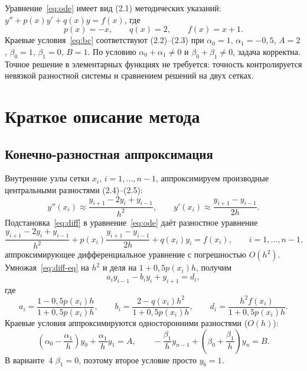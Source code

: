 \documentclass[14pt,a4paper]{extarticle}
\begin{document}
Уравнение~\eqref{eq:ode} имеет вид (2.1) методических указаний:
$y''+p(x)y'+q(x)y=f(x)$, где
\begin{equation}
    p(x) = -x, \qquad q(x) = 2, \qquad f(x) = x+1 .
    \label{eq:coeff}
\end{equation}
Краевые условия~\eqref{eq:bc} соответствуют (2.2)--(2.3) при
$\alpha_0=1$, $\alpha_1=-0{,}5$, $A=2$, $\beta_0=1$, $\beta_1=0$, $B=1$.
По условию $\alpha_0+\alpha_1\ne0$ и $\beta_0+\beta_1\ne0$, задача
корректна. Точное решение в элементарных функциях не требуется: точность
контролируется невязкой разностной системы и сравнением решений на двух
сетках.

\section{Краткое описание метода}

\subsection{Конечно-разностная аппроксимация}

Внутренние узлы сетки $x_i$, $i=1,\ldots,n-1$, аппроксимируем производные
центральными разностями (2.4)--(2.5):
\begin{equation}
    y''(x_i) \approx \frac{y_{i+1}-2y_i+y_{i-1}}{h^2}, \qquad
    y'(x_i) \approx \frac{y_{i+1}-y_{i-1}}{2h} .
    \label{eq:diff}
\end{equation}
Подстановка~\eqref{eq:diff} в уравнение~\eqref{eq:ode} даёт разностное
уравнение
\begin{equation}
    \frac{y_{i+1}-2y_i+y_{i-1}}{h^2}
    + p(x_i)\frac{y_{i+1}-y_{i-1}}{2h}
    + q(x_i)y_i = f(x_i), \qquad i=1,\ldots,n-1,
    \label{eq:diff-eq}
\end{equation}
аппроксимирующее дифференциальное уравнение с погрешностью $O(h^2)$.
Умножая~\eqref{eq:diff-eq} на $h^2$ и деля на $1+0{,}5p(x_i)h$, получим
\begin{equation}
    a_i y_{i-1} - b_i y_i + y_{i+1} = d_i,
    \label{eq:three}
\end{equation}
где
\begin{equation}
    a_i = \frac{1-0{,}5p(x_i)h}{1+0{,}5p(x_i)h},\qquad
    b_i = \frac{2-q(x_i)h^2}{1+0{,}5p(x_i)h},\qquad
    d_i = \frac{h^2 f(x_i)}{1+0{,}5p(x_i)h}.
    \label{eq:abd}
\end{equation}
Краевые условия аппроксимируются односторонними разностями ($O(h)$):
\begin{equation}
    \left(\alpha_0-\frac{\alpha_1}{h}\right)y_0
      +\frac{\alpha_1}{h}y_1 = A,\qquad
    -\frac{\beta_1}{h}y_{n-1}
      +\left(\beta_0+\frac{\beta_1}{h}\right)y_n = B .
    \label{eq:bc-diff}
\end{equation}
В варианте~4 $\beta_1=0$, поэтому второе условие просто $y_6=1$.
\end{document}
